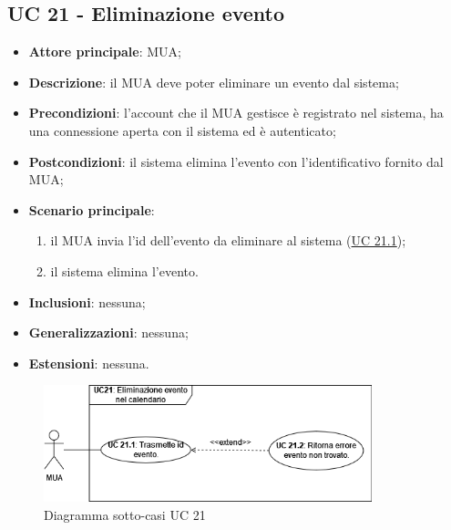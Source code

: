 \subsection{UC 21 - Eliminazione evento} \label{sec:UC21}
    \begin{itemize}
        \item \textbf{Attore principale}: MUA;
        \item \textbf{Descrizione}: il MUA deve poter eliminare un evento dal sistema;
        \item \textbf{Precondizioni}: l’account che il MUA gestisce è registrato nel sistema, ha una connessione aperta con il sistema ed è autenticato;
        \item \textbf{Postcondizioni}: il sistema elimina l'evento con l'identificativo fornito dal MUA;
        \item \textbf{Scenario principale}:
            \begin{enumerate}
                \item il MUA invia l'id dell'evento da eliminare al sistema (\hyperref[sec:UC21.1]{UC 21.1});
                \item il sistema elimina l'evento.
            \end{enumerate}
        \item \textbf{Inclusioni}: nessuna;
        \item \textbf{Generalizzazioni}: nessuna;
        \item \textbf{Estensioni}: nessuna.
    \end{itemize}

\begin{figure}[h]
    \includegraphics[width=0.85\textwidth]{sections/uc_imgs/UC21.png}
    \centering
    \caption{Diagramma sotto-casi UC 21}
\end{figure}

